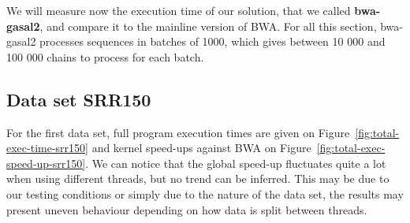We will measure now the execution time of our solution, that we called \textbf{bwa-gasal2}, and compare it to the mainline version of BWA. For all this section, bwa-gasal2 processes sequences in batches of 1000, which gives between 10 000 and 100 000 chains to process for each batch.

\subsection{Data set SRR150}

For the first data set, full program execution times are given on Figure~\ref{fig:total-exec-time-srr150} and kernel speed-ups against BWA on Figure~\ref{fig:total-exec-speed-up-srr150}. We can notice that the global speed-up fluctuates quite a lot when using different threads, but no trend can be inferred. This may be due to our testing conditions or simply due to the nature of the data set, the results may present uneven behaviour depending on how data is split between threads.

